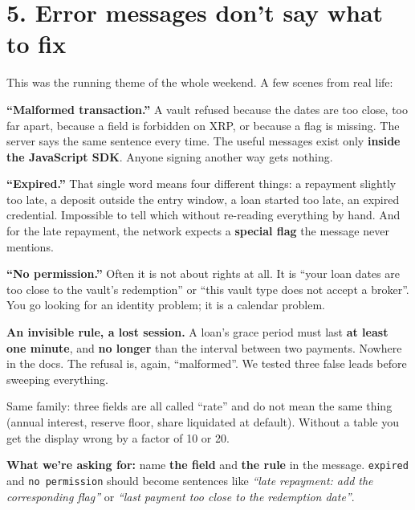 \documentclass[10pt,a4paper]{article}
\newcommand{\tc}[1]{\texttt{\small #1}}
\begin{document}
\vspace{4pt}

\section*{5. Error messages don't say what to fix}

This was the running theme of the whole weekend. A few scenes from real life:

\textbf{``Malformed transaction.''}
A vault refused because the dates are too close, too far apart, because a field is forbidden on XRP, or because a flag is missing. The server says the same sentence every time. The useful messages exist only \textbf{inside the JavaScript SDK}. Anyone signing another way gets nothing.

\textbf{``Expired.''}
That single word means four different things: a repayment slightly too late, a deposit outside the entry window, a loan started too late, an expired credential. Impossible to tell which without re-reading everything by hand. And for the late repayment, the network expects a \textbf{special flag} the message never mentions.

\textbf{``No permission.''}
Often it is not about rights at all. It is ``your loan dates are too close to the vault's redemption'' or ``this vault type does not accept a broker''. You go looking for an identity problem; it is a calendar problem.

\textbf{An invisible rule, a lost session.}
A loan's grace period must last \textbf{at least one minute}, and \textbf{no longer} than the interval between two payments. Nowhere in the docs. The refusal is, again, ``malformed''. We tested three false leads before sweeping everything.

Same family: three fields are all called ``rate'' and do not mean the same thing (annual interest, reserve floor, share liquidated at default). Without a table you get the display wrong by a factor of 10 or 20.

\textbf{What we're asking for:} name \textbf{the field} and \textbf{the rule} in the message. \tc{expired} and \tc{no permission} should become sentences like \emph{``late repayment: add the corresponding flag''} or \emph{``last payment too close to the redemption date''}.

\vspace{4pt}
\end{document}

